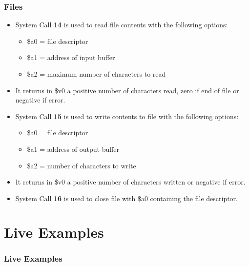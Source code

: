 \documentclass[
	10pt, %
	hmargin=1cm,vmargin=0cm,head=0.5cm,headsep=0pt,foot=0.5cm,margin=2cm
]{beamer}
\begin{document}
\begin{frame}
	\frametitle{Files}
	\begin{itemize}
		\item System Call \textbf{14} is used to read file contents with the following options:
		\begin{itemize}
			\item  \color{red}\$a0 \color{black}\hspace{0.05cm} = file descriptor 
			\item  \color{red}\$a1 \color{black}\hspace{0.05cm} = address of input buffer
			\item  \color{red}\$a2 \color{black}\hspace{0.05cm} = maximum number of characters to read
		\end{itemize}
		\item It returns in \color{red}\$v0\color{black}\hspace{0.05cm} a positive number of characters read, zero if end of file or negative if error. \pause
		\item System Call \textbf{15} is used to write contents to file with the following options:
		\begin{itemize}
			\item \color{red}\$a0\color{black}\hspace{0.05cm} = file descriptor 
			\item \color{red}\$a1\color{black}\hspace{0.05cm} = address of output buffer
			\item \color{red}\$a2\color{black}\hspace{0.05cm} = number of characters to write
		\end{itemize}
		\item It returns in \color{red}\$v0\color{black}\hspace{0.05cm} a positive number of characters written or negative if error. \pause
		\item System Call \textbf{16} is used to close file with \color{red}\$a0\color{black}\hspace{0.05cm} containing the file descriptor.
	\end{itemize}
\end{frame}

\section{Live Examples}
\begin{frame}
	\frametitle{Live Examples}
	
\end{frame}
\end{document}
